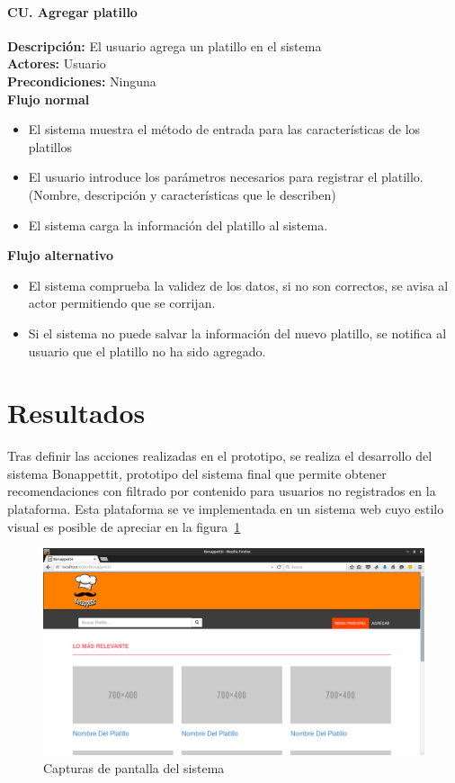     \paragraph{CU. Agregar platillo\\}
    \textbf{Descripción:} El usuario agrega un platillo en el sistema\\
    \textbf{Actores:} Usuario\\
    \textbf{Precondiciones:} Ninguna\\
    \textbf{Flujo normal}\\
    \begin{itemize}
      \item El sistema muestra el método de entrada para las características de los platillos
      \item El usuario introduce los parámetros necesarios para registrar el platillo. (Nombre, descripción y características que le describen)
      \item El sistema carga la información del platillo al sistema.
    \end{itemize}
    \textbf{Flujo alternativo}\\
    \begin{itemize}
      \item El sistema comprueba la validez de los datos, si no son correctos, se avisa al actor permitiendo que se corrijan. 
      \item Si el sistema no puede salvar la información del nuevo platillo, se notifica al usuario que el platillo no ha sido agregado.
    \end{itemize}
    
  \section{Resultados}
    Tras definir las acciones realizadas en el prototipo, se realiza el desarrollo del sistema Bonappettit, prototipo del sistema final que permite obtener recomendaciones con filtrado por contenido para usuarios no registrados en la plataforma. Esta plataforma se ve implementada en un sistema web cuyo estilo visual es posible de apreciar en la figura~\ref{fig: screenshot1 p2}
        \begin{figure}[h!]
          \centering
          \includegraphics[width=16cm]{./images/bonappettit.png}
          \caption{Capturas de pantalla del sistema}
          \label{fig: screenshot1 p2}
        \end{figure}

